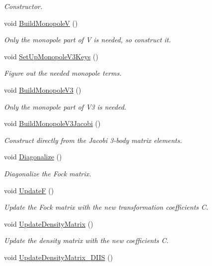 \begin{DoxyCompactItemize}
\begin{DoxyCompactList}\small\item\em Constructor. \end{DoxyCompactList}\item 
void \hyperlink{classHartreeFock_a3d6bac9b4403e4bc599a89ad0c9b6056}{Build\-Monopole\-V} ()
\begin{DoxyCompactList}\small\item\em Only the monopole part of V is needed, so construct it. \end{DoxyCompactList}\item 
void \hyperlink{classHartreeFock_a608db2a6188579180d6fc51230a4aa3e}{Set\-Up\-Monopole\-V3\-Keys} ()
\begin{DoxyCompactList}\small\item\em Figure out the needed monopole terms. \end{DoxyCompactList}\item 
void \hyperlink{classHartreeFock_a1c146af25a09f427cc626d877ec6e518}{Build\-Monopole\-V3} ()
\begin{DoxyCompactList}\small\item\em Only the monopole part of V3 is needed. \end{DoxyCompactList}\item 
void \hyperlink{classHartreeFock_a0a1bd3a195362c73e6c9e10a38fcb13b}{Build\-Monopole\-V3\-Jacobi} ()
\begin{DoxyCompactList}\small\item\em Construct directly from the Jacobi 3-\/body matrix elements. \end{DoxyCompactList}\item 
void \hyperlink{classHartreeFock_a00f7b0c4cb7373a3f1a69ca27a4dfaed}{Diagonalize} ()
\begin{DoxyCompactList}\small\item\em Diagonalize the Fock matrix. \end{DoxyCompactList}\item 
void \hyperlink{classHartreeFock_a84fe0eb16f6e5835c920bf8fa98c4442}{Update\-F} ()
\begin{DoxyCompactList}\small\item\em Update the Fock matrix with the new transformation coefficients C. \end{DoxyCompactList}\item 
void \hyperlink{classHartreeFock_aad38c905e7e9f9e9757b5800e6910c61}{Update\-Density\-Matrix} ()
\begin{DoxyCompactList}\small\item\em Update the density matrix with the new coefficients C. \end{DoxyCompactList}\item 
\hypertarget{classHartreeFock_a1eb3f52619f55db878f9e465265aa698}{void \hyperlink{classHartreeFock_a1eb3f52619f55db878f9e465265aa698}{Update\-Density\-Matrix\-\_\-\-D\-I\-I\-S} ()}\label{classHartreeFock_a1eb3f52619f55db878f9e465265aa698}


\end{DoxyCompactItemize}

